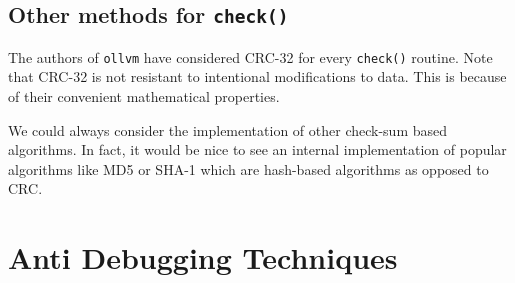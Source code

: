 \documentclass[11pt]{article}
\begin{document}
\subsection{Other methods for \texttt{check()}}
The authors of \texttt{ollvm} have considered CRC-32 for every \texttt{check()} routine. Note that CRC-32 is not resistant to intentional modifications to data. This is because of their convenient mathematical properties. 

We could always consider the implementation of other check-sum based algorithms. In fact, it would be nice to see an internal implementation of popular algorithms like MD5 or SHA-1\cite{Eastlake:2001:USH:RFC3174} which are hash-based algorithms as opposed to CRC.

\section{Anti Debugging Techniques}
\end{document}
